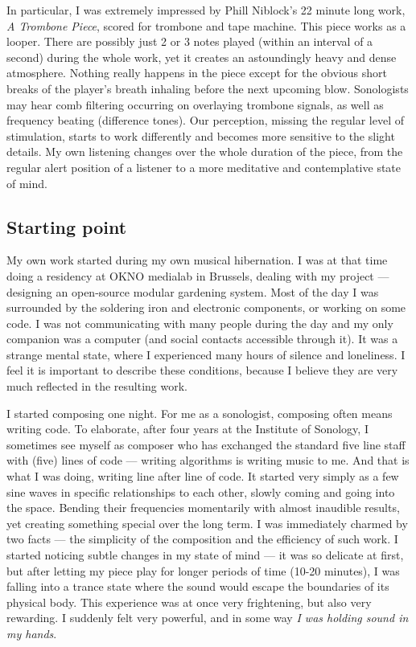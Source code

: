 \documentclass[12pt,a4paper,oneside]{report}
\begin{document}
In particular, I was extremely impressed by Phill Niblock's 22 minute long work, \emph{A Trombone Piece}, scored for trombone and tape machine. This piece works as a looper. There are possibly just 2 or 3 notes played (within an interval of a second) during the whole work, yet it creates an astoundingly heavy and dense atmosphere. Nothing really happens in the piece except for the obvious short breaks of the player's breath inhaling before the next upcoming blow. Sonologists may hear comb filtering occurring on overlaying trombone signals, as well as frequency beating (difference tones). Our perception, missing the regular level of stimulation, starts to work differently and becomes more sensitive to the slight details. My own listening changes over the whole duration of the piece, from the regular alert position of a listener to a more meditative and contemplative state of mind. 

\subsection{Starting point}

My own work started during my own musical hibernation. I was at that time doing a residency at OKNO medialab in Brussels, dealing with my project --- designing an open-source modular gardening system. Most of the day I was surrounded by the soldering iron and electronic components, or working on some code. I was not communicating with many people during the day and my only companion was a computer (and social contacts accessible through it). It was a strange mental state, where I experienced many hours of silence and loneliness. I feel it is important to describe these conditions, because I believe they are very much reflected in the resulting work. 

I started composing one night. For me as a sonologist, composing often means writing code. To elaborate, after four years at the Institute of Sonology, I sometimes see myself as composer who has exchanged the standard five line staff with (five) lines of code --- writing algorithms is writing music to me. And that is what I was doing, writing line after line of code. It started very simply as a few sine waves in specific relationships to each other, slowly coming and going into the space. Bending their frequencies momentarily with almost inaudible results, yet creating something special over the long term. I was immediately charmed by two facts --- the simplicity of the composition and the efficiency of such work. I started noticing subtle changes in my state of mind --- it was so delicate at first, but after letting my piece play for longer periods of time (10-20 minutes), I was falling into a trance state where the sound would escape the boundaries of its physical body. This experience was at once very frightening, but also very rewarding. I suddenly felt very powerful, and in some way \emph{I was holding sound in my hands}. 
\end{document}
